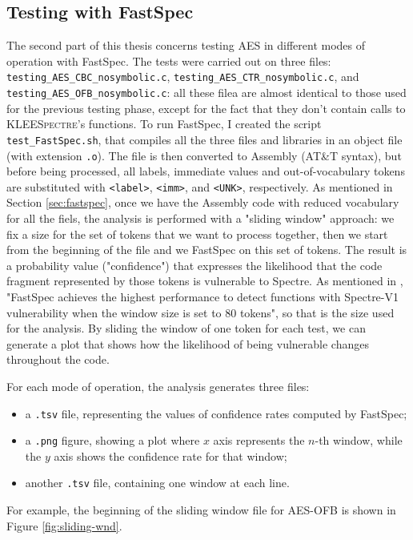 \documentclass[12pt,a4paper]{book}
\theoremstyle{definition}
\begin{document}
	\subsection{Testing with FastSpec}
	The second part of this thesis concerns testing AES in different modes of operation with FastSpec. The tests were carried out on three files: \texttt{testing\_AES\_CBC\_nosymbolic.c}, \texttt{testing\_AES\_CTR\_nosymbolic.c}, and \texttt{testing\_AES\_OFB\_nosymbolic.c}: all these filea are almost identical to those used for the previous testing phase, except for the fact that they don't contain calls to \textsc{KLEESpectre}'s functions. To run FastSpec, I created the script \texttt{test\_FastSpec.sh}, that compiles all the three files and libraries in an object file (with extension \texttt{.o}). The file is then converted to Assembly (AT\&T syntax), but before being processed, all labels, immediate values and out-of-vocabulary tokens are substituted with \texttt{<label>}, \texttt{<imm>}, and \texttt{<UNK>}, respectively. As mentioned in Section \ref{sec:fastspec}, once we have the Assembly code with reduced vocabulary for all the fiels, the analysis is performed with a "sliding window" approach: we fix a size for the set of tokens that we want to process together, then we start from the beginning of the file and we FastSpec on this set of tokens. The result is a probability value ("confidence") that expresses the likelihood that the code fragment represented by those tokens is vulnerable to Spectre. As mentioned in \cite{Tol2021}, "FastSpec achieves the highest performance to detect functions with Spectre-V1 vulnerability when the window size is set to 80 tokens", so that is the size used for the analysis. By sliding the window of one token for each test, we can generate a plot that shows how the likelihood of being vulnerable changes throughout the code. 
	
	For each mode of operation, the analysis generates three files:
	\begin{itemize}
		\item a \texttt{.tsv} file, representing the values of confidence rates computed by FastSpec;
		\item a \texttt{.png} figure, showing a plot where $x$ axis represents the $n$-th window, while the $y$ axis shows the confidence rate for that window;
		\item another \texttt{.tsv} file, containing one window at each line.
	\end{itemize}
	
	For example, the beginning of the sliding window file for AES-OFB is shown in Figure \ref{fig:sliding-wnd}.
	
\end{document}
